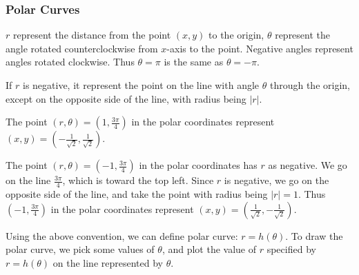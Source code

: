 \subsubsection*{Polar Curves}

$r$ represent the distance from the point $(x, y)$ to the origin, $\theta$ represent the angle rotated counterclockwise from $x$-axis to the point. Negative angles represent angles rotated clockwise. Thus $\theta = \pi$ is the same as $\theta = -\pi$.

If $r$ is negative, it represent the point on the line with angle $\theta$ through the origin, except on the opposite side of the line, with radius being $|r|$.

\begin{example}
    The point $(r, \theta) = (1, \frac{3\pi}{4})$ in the polar coordinates represent $(x, y) = (-\frac{1}{\sqrt{2}}, \frac{1}{\sqrt{2}})$. 

    The point $(r, \theta) = (-1, \frac{3\pi}{4})$ in the polar coordinates has $r$ as negative. We go on the line $\frac{3\pi}{4}$, which is toward the top left. Since $r$ is negative, we go on the opposite side of the line, and take the point with radius being $|r| = 1$. Thus $(-1, \frac{3\pi}{4})$ in the polar coordinates represent $(x, y) = (\frac{1}{\sqrt{2}}, -\frac{1}{\sqrt{2}})$. 
\end{example}

Using the above convention, we can define polar curve: $r = h(\theta)$. To draw the polar curve, we pick some values of $\theta$, and plot the value of $r$ specified by $r = h(\theta)$ on the line represented by $\theta$.

